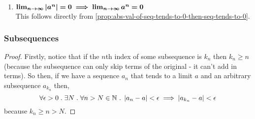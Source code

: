 \documentclass[../MathsNotesBase.tex]{subfiles}
\begin{document}
{\begin{exe}
{\begin{enumerate}
					\bigskip
					\item{${\bm{ \lim_{n \to \infty} \left\lvert a^n\right\rvert = 0 \implies \lim_{n \to \infty} a^n = 0 }}$}\\
					
					This follows directly from \autoref{prop:abs-val-of-seq-tends-to-0-then-seq-tends-to-0}.
				\end{enumerate}
			}\label{ex:geom_prog_common_ratio_less_than_one_tends_to_zero}
		\end{exe}
	}




\pagebreak


		\subsubsection{Subsequences}
		\bigskip
		\label{def:subsequence}
	
		\medskip
		\begin{proof}
			Firstly, notice that if the $n$th index of some subsequence is $k_n$ then $k_n \geq n$ (because the subsequence can only skip terms of the original - it can't add in terms). So then, if we have a sequence $a_n$ that tends to a limit $a$ and an arbitrary subsequence $a_{k_n}$ then,
			\[ \forall \epsilon > 0 \;.\; \exists N \;.\; \forall n > N \in \mathbb{N}^{} \;.\; \left\lvert a_n - a\right\rvert < \epsilon \implies \left\lvert a_{k_n} - a\right\rvert < \epsilon \]
			because ${ k_n \geq n > N }$.
		\end{proof}
	
\end{document}
